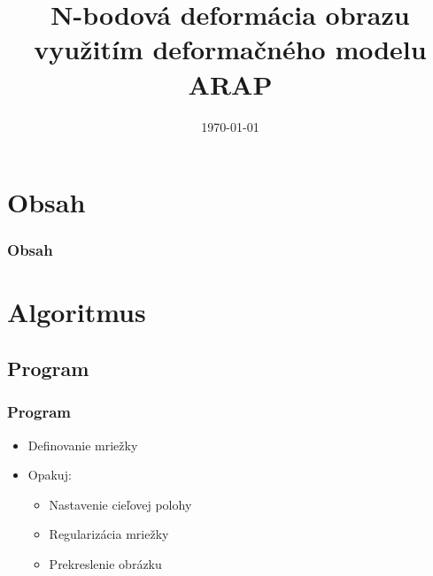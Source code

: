 \documentclass[a4paper]{beamer}
\author[\FirstNameAbbreviated. \LastName]{\FirstName{} \LastName}
\title[ARAP]{N-bodová deformácia obrazu využitím deformačného modelu ARAP}
\institute[\FacultyAndUniversityAbbr]{\\ \Faculty\\ \University}
\date{\today}
\begin{document}
\begin{frame}
	\titlepage
\end{frame}

\section*{Obsah}
	\begin{frame}[allowframebreaks]
		\frametitle{Obsah}
	\tableofcontents
\end{frame}

\section{Algoritmus}

\subsection{Program}
\begin{frame}	
	\frametitle{Program}
	\begin{itemize}
		\item Definovanie mriežky
		\item Opakuj:
		\begin{itemize}
			\item Nastavenie cieľovej polohy
			\item Regularizácia mriežky
			\item Prekreslenie obrázku
		\end{itemize}
	\end{itemize}
\end{frame}
\end{document}
